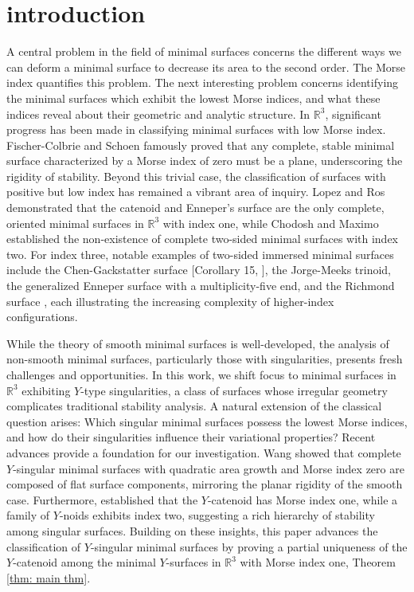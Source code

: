 \documentclass[10pt,a4paper]{amsart}
\theoremstyle{theorem}
\theoremstyle{definition}
\numberwithin{equation}{section}
\begin{document}
\section{introduction}

A central problem in the field of minimal surfaces concerns the different ways we can deform a minimal surface to decrease its area to the second order. The Morse index quantifies this problem. The next interesting problem concerns identifying the minimal surfaces which exhibit the lowest Morse indices, and what these indices reveal about their geometric and analytic structure. In $\mathbb{R}^3$, significant progress has been made in classifying minimal surfaces with low Morse index. Fischer-Colbrie and Schoen \cite{fischer1980structure} famously proved that any complete, stable minimal surface characterized by a Morse index of zero must be a plane, underscoring the rigidity of stability. Beyond this trivial case, the classification of surfaces with positive but low index has remained a vibrant area of inquiry. Lopez and Ros \cite{lopez1989complete} demonstrated that the catenoid and Enneper’s surface are the only complete, oriented minimal surfaces in $\mathbb{R}^3$  with index one, while Chodosh and Maximo \cite{chodosh2023topology} established the non-existence of complete two-sided minimal surfaces with index two. For index three, notable examples of two-sided immersed minimal surfaces include the Chen-Gackstatter surface [Corollary 15, \cite{montiel1991schrodinger}], the Jorge-Meeks trinoid, the generalized Enneper surface with a multiplicity-five end, and the Richmond surface \cite{tuzhilin1992morse}, each illustrating the increasing complexity of higher-index configurations.
\medskip

While the theory of smooth minimal surfaces is well-developed, the analysis of non-smooth minimal surfaces, particularly those with singularities, presents fresh challenges and opportunities. In this work, we shift focus to minimal surfaces in $\mathbb{R}^3$ exhibiting $Y$-type singularities, a class of surfaces whose irregular geometry complicates traditional stability analysis. A natural extension of the classical question arises: Which singular minimal surfaces possess the lowest Morse indices, and how do their singularities influence their variational properties? Recent advances provide a foundation for our investigation. Wang \cite{wang2022curvature} showed that complete $Y$-singular minimal surfaces with quadratic area growth and Morse index zero are composed of flat surface components, mirroring the planar rigidity of the smooth case. Furthermore, \cite{matinpour2024morse} established that the $Y$-catenoid has Morse index one, while a family of $Y$-noids exhibits index two, suggesting a rich hierarchy of stability among singular surfaces. Building on these insights, this paper advances the classification of $Y$-singular minimal surfaces by proving a partial uniqueness of the $Y$-catenoid among the minimal $Y$-surfaces in $\mathbb{R}^3$ with Morse index one, Theorem \ref{thm: main thm}. 
\end{document}

